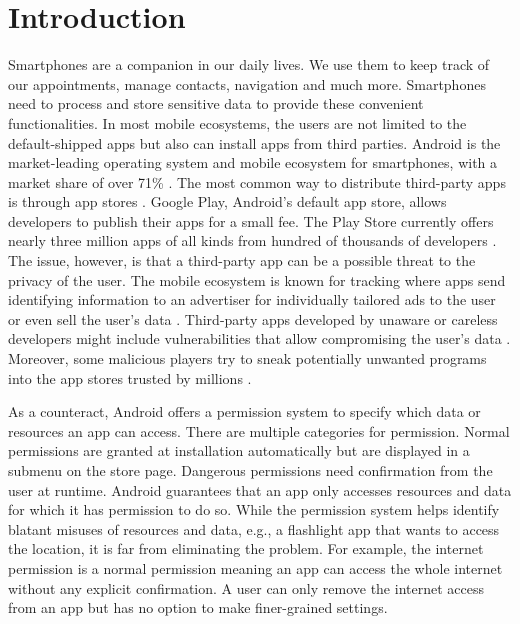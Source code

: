 \documentclass[../draft.tex]{subfiles}
\begin{document}
    \chapter{Introduction}
    Smartphones are a companion in our daily lives.
    We use them to keep track of our appointments, manage contacts, navigation and much more.
    Smartphones need to process and store sensitive data to provide these convenient functionalities.
    In most mobile ecosystems, the users are not limited to the default-shipped apps but also can install apps from third parties.
    Android is the market-leading operating system and mobile ecosystem for smartphones, with a market share of over 71\% \cite{Statista2021}.
    The most common way to distribute third-party apps is through app stores \cite{Kotzias2021}.
    Google Play, Android's default app store, allows developers to publish their apps for a small fee.
    The Play Store currently offers nearly three million apps of all kinds from hundred of thousands of developers \cite{Statista2020}.
    The issue, however, is that a third-party app can be a possible threat to the privacy of the user.
    The mobile ecosystem is known for tracking where apps send identifying information to an advertiser for individually tailored ads to the user or even sell the user's data \cite{Binns2018, Enck2011}.
    Third-party apps developed by unaware or careless developers might include vulnerabilities that allow compromising the user's data \cite{Backes2016}.
    Moreover, some malicious players try to sneak potentially unwanted programs into the app stores trusted by millions \cite{Rahman2016}.
    
    As a counteract, Android offers a permission system to specify which data or resources an app can access. 
    There are multiple categories for permission.
    Normal permissions are granted at installation automatically but are displayed in a submenu on the store page. 
    Dangerous permissions need confirmation from the user at runtime.
    Android guarantees that an app only accesses resources and data for which it has permission to do so.\footnotemark{}
    While the permission system helps identify blatant misuses of resources and data, e.g., a flashlight app that wants to access the location, it is far from eliminating the problem.
    For example, the internet permission is a normal permission meaning an app can access the whole internet without any explicit confirmation.
    A user can only remove the internet access from an app but has no option to make finer-grained settings.
\end{document}
